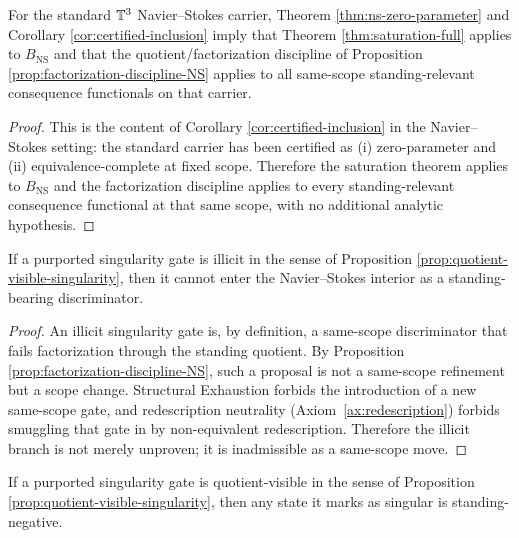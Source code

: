 \begin{proposition}\label{prop:scope-gate-expanded}
For the standard $\mathbb{T}^3$ Navier--Stokes carrier, Theorem \ref{thm:ns-zero-parameter} and Corollary
\ref{cor:certified-inclusion} imply that Theorem \ref{thm:saturation-full} applies to
$B_{\mathrm{NS}}$ and that the quotient/factorization discipline of Proposition
\ref{prop:factorization-discipline-NS} applies to all same-scope standing-relevant consequence
functionals on that carrier.
\end{proposition}

\begin{proof}
This is the content of Corollary \ref{cor:certified-inclusion} in the Navier--Stokes setting: the
standard carrier has been certified as (i) zero-parameter and (ii) equivalence-complete at fixed
scope. Therefore the saturation theorem applies to $B_{\mathrm{NS}}$ and the factorization
discipline applies to every standing-relevant consequence functional at that same scope, with no
additional analytic hypothesis.

\end{proof}

\begin{lemma}\label{lem:illicit-branch}
If a purported singularity gate is illicit in the sense of
Proposition \ref{prop:quotient-visible-singularity}, then it cannot enter the Navier--Stokes interior as a
standing-bearing discriminator.
\end{lemma}

\begin{proof}
An illicit singularity gate is, by definition, a same-scope discriminator that fails factorization through
the standing quotient. By Proposition \ref{prop:factorization-discipline-NS}, such a proposal is not a
same-scope refinement but a scope change. Structural Exhaustion forbids the introduction of a new
same-scope gate, and redescription neutrality (Axiom~\ref{ax:redescription}) forbids smuggling that gate
in by non-equivalent redescription.
Therefore the illicit branch is not merely unproven; it is inadmissible as a same-scope move.

\end{proof}

\begin{lemma}\label{lem:quotient-visible-branch}
If a purported singularity gate is quotient-visible in
the sense of Proposition \ref{prop:quotient-visible-singularity}, then any state it marks as singular is
standing-negative.
\end{lemma}

